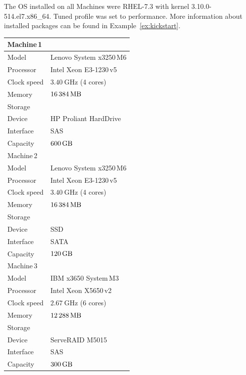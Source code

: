 \documentclass[
  color, %
  table, %
  lof,   %
  lot,   %
]{fithesis3}
\begin{document}
The OS installed on all Machines were RHEL-7.3 with kernel 3.10.0-514.el7.x86\_64. Tuned profile was set to performance. More information about installed packages can be found in Example~\ref{ex:kickstart}.

\clearpage

\begin{tabular}{|l|l|}
\hline
   \multicolumn{2}{|l|}{Machine\,1} \\ \hline %
    Model & Lenovo System x3250\,M6 \\
    \hline
    Processor & Intel Xeon E3-1230\,v5 \\
    \hline
    Clock speed & $\SI{3.40}{\giga\hertz}$ (4 cores) \\
    \hline
    Memory & $\SI{16384}{\mega\byte}$ \\
    \hline
    \multicolumn{2}{|l|}{Storage} \\ \hline
    Device & HP Proliant HardDrive\\ \hline
    Interface & SAS\\ \hline
    Capacity & $\SI{600}{\giga\byte}$\\ \hline
\hline
   \multicolumn{2}{|l|}{Machine\,2} \\ \hline %
    Model & Lenovo System x3250\,M6 \\
    \hline
    Processor & Intel Xeon E3-1230\,v5 \\
    \hline
    Clock speed & $\SI{3.40}{\giga\hertz}$ (4 cores) \\
    \hline
    Memory & $\SI{16384}{\mega\byte}$ \\
    \hline
    \multicolumn{2}{|l|}{Storage} \\ \hline
    Device & SSD \\ \hline
    Interface & SATA\\ \hline
    Capacity & $\SI{120}{\giga\byte}$\\ \hline
\hline
   \multicolumn{2}{|l|}{Machine\,3} \\ \hline %
    Model & IBM x3650 System\,M3 \\
    \hline
    Processor & Intel Xeon X5650\,v2 \\
    \hline
    Clock speed & $\SI{2.67}{\giga\hertz}$  (6 cores) \\
    \hline
    Memory &  $\SI{12288}{\mega\byte}$\\
    \hline
    \multicolumn{2}{|l|}{Storage} \\ \hline
    Device & ServeRAID M5015\\ \hline
    Interface &  SAS\\ \hline
    Capacity & $\SI{300}{\giga\byte}$\\ \hline
\end{tabular}
\label{machines}
\end{document}
